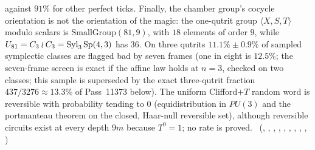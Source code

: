 against $91\%$ for other perfect ticks. Finally, the chamber group's cocycle orientation is not the orientation of the
magic: the one-qutrit group $\langle X,S,T\rangle$ modulo scalars is $\mathrm{SmallGroup}(81,9)$, with $18$ elements of order
$9$, while $U_{81}=C_3\wr C_3=\mathrm{Syl}_3\,\mathrm{Sp}(4,3)$ has $36$. On three qutrits $11.1\%\pm0.9\%$ of sampled symplectic classes are flagged bad by seven frames (one in eight is $12.5\%$; the seven-frame screen is exact if the affine law holds at $n=3$, checked on two classes; this sample is superseded by the exact three-qutrit fraction $437/3276\approx13.3\%$ of Pass~11373 below). The uniform
Clifford$+T$ random word is reversible with probability tending to $0$ (equidistribution in $PU(3)$ and the portmanteau
theorem on the closed, Haar-null reversible set), although reversible circuits exist at every depth $9m$ because
$T^9=1$; no rate is proved. \tierC\ (,
, ,
, ,
, ,
, ,
)

